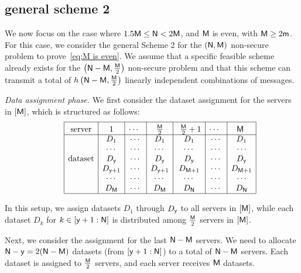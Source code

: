 \documentclass[conference,letterpaper]{IEEEtran}
\begin{document}
\subsection{general scheme 2}
\label{general scheme 2}
We now focus on the case where $1.5 {\sf M} \leq {\sf N} < 2 {\sf M}$, and ${\sf M}$ is even, with ${\sf M} \geq 2{\sf m}$. For this case, we consider the general Scheme 2 for the $({\sf N}, {\sf M})$ non-secure problem to prove~\eqref{eq:M is even}. We assume that a specific feasible scheme already exists for the $\left({\sf N} - {\sf M}, \frac{{\sf M}}{2}\right)$ non-secure problem and that this scheme can transmit a total of $h\left({\sf N} - {\sf M}, \frac{{\sf M}}{2}\right)$ linearly independent combinations of messages.

{\it Data assignment phase.}
We first consider the dataset assignment for the servers in $[{\sf M}]$, which is structured as follows:
\begin{align*}
\begin{array}{rl|c|c|c|c|c|c|c|}\cline{3-3}\cline{4-4}\cline{5-5}\cline{6-6}\cline{7-7}\cline{8-8}\cline{9-9}
&&\rule{0pt}{1.2em}\mbox{server} & \rule{0pt}{1.2em}\mbox{1} &\rule{0pt}{1.2em}\mbox{$\cdots$ } &  \rule{0pt}{1.2em}\mbox{ $\frac{\Msf}{2}$ } & \rule{0pt}{1.2em}\mbox{ $\frac{\Msf}{2}  +1$}&  \rule{0pt}{1.2em}\mbox{$\cdots$ } &  \rule{0pt}{1.2em}\mbox{$\Msf$ }\\ 
\cline{3-3}\cline{4-4}\cline{5-5}\cline{6-6}\cline{7-7}\cline{8-8}\cline{9-9}
&& &D_1 & \cdots & D_1 & D_1 & \cdots & D_1 \\
&& &\cdots & \cdots & \cdots & \cdots & \cdots & \cdots \\ 
&& \mbox{dataset}&D_{\ysf} & \cdots & D_{\ysf} & D_{\ysf} & \cdots & D_{\ysf} \\
&& &D_{\ysf+1} & \cdots & D_{\ysf+1} & D_{\Msf+1} & \cdots & D_{\Msf+1} \\ 
&& &\cdots & \cdots & \cdots & \cdots & \cdots & \cdots \\
&& &D_{\Msf} & \cdots & D_{\Msf}&  D_{\Nsf} & \cdots & D_{\Nsf}\\  
\cline{3-3}\cline{4-4}\cline{5-5}\cline{6-6}\cline{7-7}\cline{8-8}\cline{9-9}
\end{array}
\end{align*}

In this setup, we assign datasets $D_1$ through $D_{{\sf y}}$ to all servers in $[{\sf M}]$, while each dataset $D_k$ for $k \in [{\sf y}+1 : {\sf N}]$ is distributed among $\frac{{\sf M}}{2}$ servers in $[{\sf M}]$.

Next, we consider the assignment for the last ${\sf N}-{\sf M}$ servers.
We need to allocate ${\sf N}-{\sf y} = 2({\sf N}-{\sf M})$ datasets (from $[{\sf y}+1 : {\sf N}]$) to a total of ${\sf N}-{\sf M}$ servers. Each dataset is assigned to $\frac{{\sf M}}{2}$ servers, and each server receives ${\sf M}$ datasets. 
\end{document}
